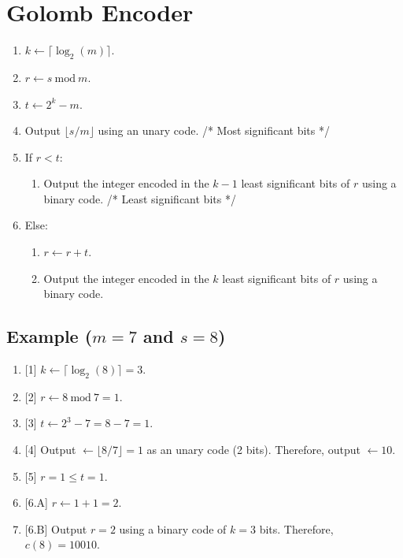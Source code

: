 \section{Golomb Encoder}
\begin{enumerate}
\def\labelenumi{\arabic{enumi}.}
\tightlist
\item
  \(k\leftarrow \lceil\log_2(m)\rceil\).
\item
  \(r\leftarrow s~\mathrm{mod}~m\).
\item
  \(t\leftarrow 2^k-m\).
\item
  Output \(\lfloor s/m \rfloor\) using an unary code. /* Most
  significant bits */
\item
  If \(r<t\):
  \begin{enumerate}
  \def\labelenumii{\arabic{enumii}.}
  \tightlist
  \item
    Output the integer encoded in the \(k-1\) least significant bits of
    \(r\) using a binary code. /* Least significant bits */
  \end{enumerate}
\item
  Else:
  \begin{enumerate}
  \def\labelenumii{\arabic{enumii}.}
  \tightlist
  \item
    \(r\leftarrow r+t\).
  \item
    Output the integer encoded in the \(k\) least significant bits of
    \(r\) using a binary code.
  \end{enumerate}
\end{enumerate}

\subsection{Example ($m=7$ and $s=8$)}
\begin{enumerate}
\def\labelenumi{\arabic{enumi}.}
\tightlist
\item
  {[}1{]} \(k\leftarrow \lceil\log_2(8)\rceil=3\).
\item
  {[}2{]} \(r\leftarrow 8~\text{mod}~7 = 1\).
\item
  {[}3{]} \(t\leftarrow 2^3-7 = 8-7 = 1\).
\item
  {[}4{]} Output \(\leftarrow \lfloor 8/7\rfloor=1\) as an unary code (2
  bits). Therefore, output \(\leftarrow 10\).
\item
  {[}5{]} \(r=1\le t=1\).
\item
  {[}6.A{]} \(r\leftarrow 1+1=2\).
\item
  {[}6.B{]} Output \(r=2\) using a binary code of \(k=3\) bits.
  Therefore, \(c(8)=10010\).
\end{enumerate}

